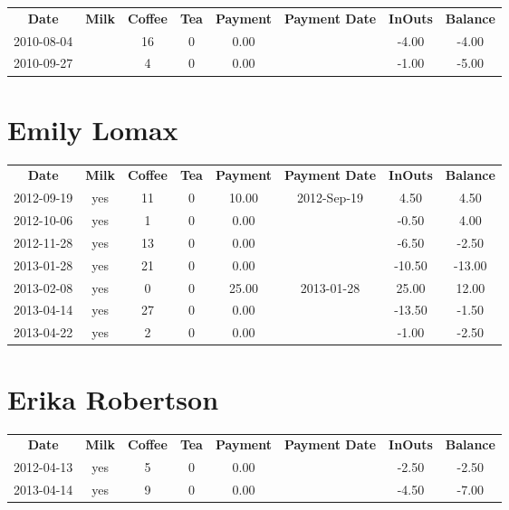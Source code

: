 \begin{center}
\begin{tabular}{cccccccc}
\textbf{Date} & \textbf{Milk} & \textbf{Coffee} & \textbf{Tea} & \textbf{Payment} & \textbf{Payment Date} & \textbf{InOuts} & \textbf{Balance} \\
2010-08-04 &  & 16 & 0 & 0.00 &  & -4.00 & -4.00\\ 
2010-09-27 &  &  4 & 0 & 0.00 &  & -1.00 & -5.00
\end{tabular}
\end{center}

\section{Emily Lomax}

\begin{center}
\begin{tabular}{cccccccc}
\textbf{Date} & \textbf{Milk} & \textbf{Coffee} & \textbf{Tea} & \textbf{Payment} & \textbf{Payment Date} & \textbf{InOuts} & \textbf{Balance} \\
2012-09-19 & yes & 11 & 0 & 10.00 & 2012-Sep-19 &   4.50 &   4.50\\ 
2012-10-06 & yes &  1 & 0 &  0.00 &  &  -0.50 &   4.00\\ 
2012-11-28 & yes & 13 & 0 &  0.00 &  &  -6.50 &  -2.50\\ 
2013-01-28 & yes & 21 & 0 &  0.00 &  & -10.50 & -13.00\\ 
2013-02-08 & yes &  0 & 0 & 25.00 & 2013-01-28 &  25.00 &  12.00\\ 
2013-04-14 & yes & 27 & 0 &  0.00 &  & -13.50 &  -1.50\\ 
2013-04-22 & yes &  2 & 0 &  0.00 &  &  -1.00 &  -2.50
\end{tabular}
\end{center}

\section{Erika Robertson}

\begin{center}
\begin{tabular}{cccccccc}
\textbf{Date} & \textbf{Milk} & \textbf{Coffee} & \textbf{Tea} & \textbf{Payment} & \textbf{Payment Date} & \textbf{InOuts} & \textbf{Balance} \\
2012-04-13 & yes & 5 & 0 & 0.00 &  & -2.50 & -2.50\\ 
2013-04-14 & yes & 9 & 0 & 0.00 &  & -4.50 & -7.00
\end{tabular}
\end{center}

